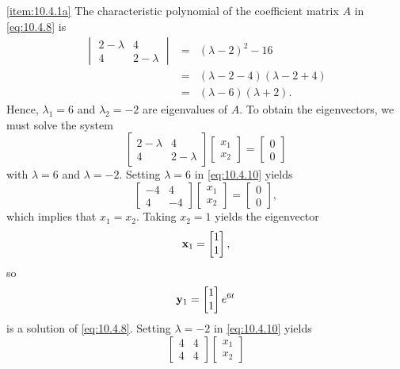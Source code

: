 \documentclass{ximera}
\begin{document}
\begin{example}
\begin{explanation}
\ref{item:10.4.1a}  The characteristic
polynomial of the  coefficient matrix $A$ in  \eqref{eq:10.4.8} is
\begin{eqnarray*}
\begin{vmatrix} 2-\lambda&4\\4&2-\lambda\end{vmatrix}
&=& (\lambda-2)^2-16\\
&=& (\lambda-2-4)(\lambda-2+4)\\
&=& (\lambda-6)(\lambda+2).
\end{eqnarray*}
Hence,  $\lambda_1=6$ and $\lambda_2
=-2$ are eigenvalues of $A$. To obtain the eigenvectors,
we must solve the system
\begin{equation}\label{eq:10.4.10}
\begin{bmatrix} 2-\lambda&4\\4&2-\lambda\end{bmatrix}
\begin{bmatrix} x_1\\x_2\end{bmatrix}=
\begin{bmatrix} 0\\0\end{bmatrix}
\end{equation}
with $\lambda=6$ and $\lambda=-2$.  Setting $\lambda=6$ in
\eqref{eq:10.4.10} yields
 $$
\begin{bmatrix}-4&4\\4&-4
\end{bmatrix}\begin{bmatrix}
x_1\\x_2\end{bmatrix}=\begin{bmatrix} 0\\0\end{bmatrix},
$$
which implies that $x_1=x_2$.  Taking $x_2=1$ yields the eigenvector
$$
{\bf x}_1=\begin{bmatrix} 1\\1\end{bmatrix},
$$
so
$$
{\bf y}_1=\begin{bmatrix} 1\\1\end{bmatrix}e^{6t}
$$
is a solution of  \eqref{eq:10.4.8}.  Setting $\lambda=-2$ in
\eqref{eq:10.4.10} yields
 $$
\begin{bmatrix} 4&4\\4&4\end{bmatrix}
\begin{bmatrix} x_1\\x_2

\end{bmatrix}$$
\end{explanation}
\end{example}
\end{document}
